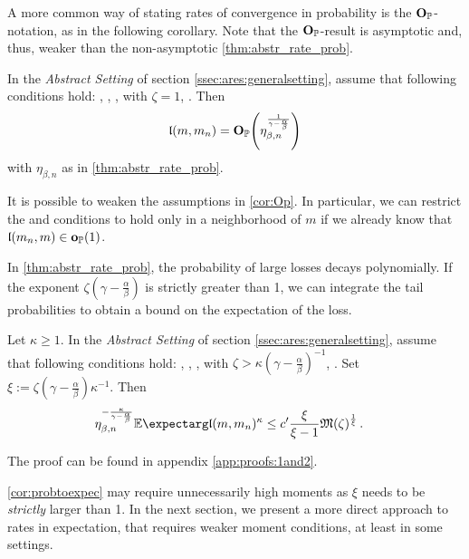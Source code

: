 A more common way of stating rates of convergence in probability is the $\mathbf{O}_{\mathbb{P}}$-notation, as in the following corollary. Note that the $\mathbf{O}_{\mathbb{P}}$-result is asymptotic and, thus, weaker than the non-asymptotic \autoref{thm:abstr_rate_prob}.
%
\begin{corollary}\label{cor:Op}
	In the \textit{Abstract Setting} of section \ref{ssec:ares:generalsetting}, assume that following conditions hold:
	, , ,  with $\zeta=1$, .
	Then
	\begin{equation*}
		\mathfrak{l} (m, m_n) = \mathbf{O}_{\mathbb{P}}\!\left( \eta_{\beta,n}^{\frac{1}{\gamma-\frac{\alpha}{\beta}}} \right)
	\end{equation*}
	with $\eta_{\beta,n}$ as in \autoref{thm:abstr_rate_prob}.
\end{corollary}
%
It is possible to weaken the assumptions in \autoref{cor:Op}. In particular, we can restrict the  and  conditions to hold only in a neighborhood of $m$ if we already know that $\mathfrak{l}(m_n,m) \in \mathbf{o}_{\mathbb{P}}(1)$.

In \autoref{thm:abstr_rate_prob}, the probability of large losses decays polynomially. If the exponent $\zeta(\gamma-\frac\alpha\beta)$ is strictly  greater than 1, we can integrate the tail probabilities to obtain a bound on the expectation of the loss.
%
\begin{corollary}\label{cor:probtoexpec}
	Let $\kappa \geq 1$.
	In the \textit{Abstract Setting} of section \ref{ssec:ares:generalsetting}, assume that following conditions hold:
	, , ,  with $\zeta > \kappa(\gamma - \frac\alpha\beta)^{-1}$, . Set $\xi := \zeta(\gamma-\frac\alpha\beta)\kappa^{-1}$. 
	Then
	\begin{align*}
		\eta_{\beta,n}^{-\frac{\kappa}{\gamma-\frac{\alpha}{\beta}}} \Ex{\mf l (m, m_n)^\kappa} 
		&\leq 
		c\pr \frac{\xi}{\xi-1} \mf M(\zeta)^{\frac1\xi}
		\eqfs
	\end{align*}
\end{corollary}
%
%
The proof can be found in appendix \autoref{app:proofs:1and2}.

\autoref{cor:probtoexpec} may require unnecessarily high moments as $\xi$ needs to be \textit{strictly} larger than 1. In the next section, we present a more direct approach to rates in expectation, that requires weaker moment conditions, at least in some settings.
%
%
%
